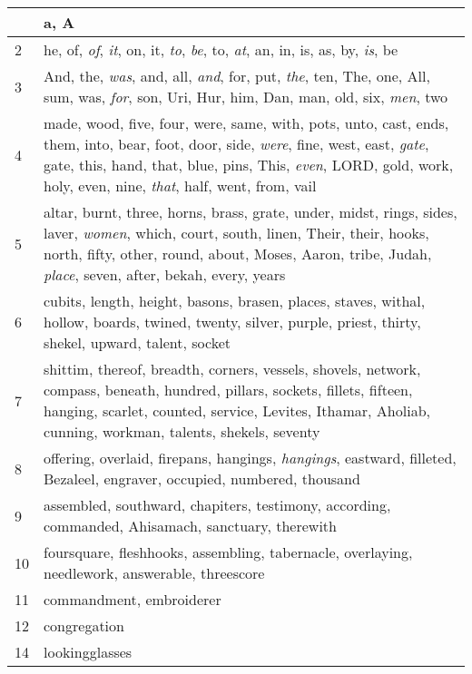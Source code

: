 \begin{longtable}{l|p{3.75in}}
\hline \hline
\endlastfoot
1 & a, A \\ \hline
2 & he, of, \emph{of}, \emph{it}, on, it, \emph{to}, \emph{be}, to, \emph{at}, an, in, is, as, by, \emph{is}, be \\ \hline
3 & And, the, \emph{was}, and, all, \emph{and}, for, put, \emph{the}, ten, The, one, All, sum, was, \emph{for}, son, Uri, Hur, him, Dan, man, old, six, \emph{men}, two \\ \hline
4 & made, wood, five, four, were, same, with, pots, unto, cast, ends, them, into, bear, foot, door, side, \emph{were}, fine, west, east, \emph{gate}, gate, this, hand, that, blue, pins, This, \emph{even}, LORD, gold, work, holy, even, nine, \emph{that}, half, went, from, vail \\ \hline
5 & altar, burnt, three, horns, brass, grate, under, midst, rings, sides, laver, \emph{women}, which, court, south, linen, Their, their, hooks, north, fifty, other, round, about, Moses, Aaron, tribe, Judah, \emph{place}, seven, after, bekah, every, years \\ \hline
6 & cubits, length, height, basons, brasen, places, staves, withal, hollow, boards, twined, twenty, silver, purple, priest, thirty, shekel, upward, talent, socket \\ \hline
7 & shittim, thereof, breadth, corners, vessels, shovels, network, compass, beneath, hundred, pillars, sockets, fillets, fifteen, hanging, scarlet, counted, service, Levites, Ithamar, Aholiab, cunning, workman, talents, shekels, seventy \\ \hline
8 & offering, overlaid, firepans, hangings, \emph{hangings}, eastward, filleted, Bezaleel, engraver, occupied, numbered, thousand \\ \hline
9 & assembled, southward, chapiters, testimony, according, commanded, Ahisamach, sanctuary, therewith \\ \hline
10 & foursquare, fleshhooks, assembling, tabernacle, overlaying, needlework, answerable, threescore \\ \hline
11 & commandment, embroiderer \\ \hline
12 & congregation \\ \hline
14 & lookingglasses \\ \hline
\end{longtable}






 



